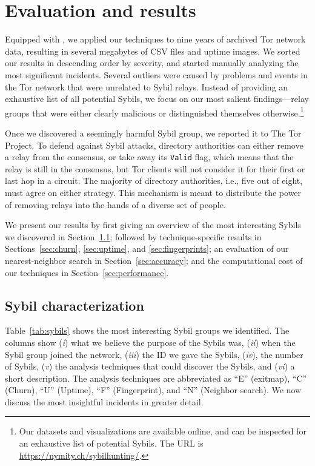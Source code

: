 \section{Evaluation and results}
\label{sec:results}
Equipped with \sys, we applied our techniques to nine years of archived Tor
network data, resulting in several megabytes of CSV files and uptime images.  We
sorted our results in descending order by severity, and started manually
analyzing the most significant incidents.  Several outliers were caused by
problems and events in the Tor network that were unrelated to Sybil relays.
Instead of providing an exhaustive list of all potential Sybils, we focus on our
most salient findings---relay groups that were either clearly malicious or
distinguished themselves otherwise.\footnote{Our datasets and visualizations are
available online, and can be inspected for an exhaustive list of potential
Sybils.  The URL is \url{https://nymity.ch/sybilhunting/}.}

Once we discovered a seemingly harmful Sybil group, we reported it to The Tor
Project.  To defend against Sybil attacks, directory authorities can either
remove a relay from the consensus, or take away its \texttt{Valid} flag, which
means that the relay is still in the consensus, but Tor clients will not
consider it for their first or last hop in a circuit.  The majority of directory
authorities, i.e., five out of eight, must agree on either strategy.  This
mechanism is meant to distribute the power of removing relays into the hands of
a diverse set of people.

We present our results by first giving an overview of the most interesting
Sybils we discovered in Section~\ref{sec:sybil_groups}; followed by
technique-specific results in Sections~\ref{sec:churn}, \ref{sec:uptime}, and
\ref{sec:fingerprints}; an evaluation of our nearest-neighbor search in
Section~\ref{sec:accuracy}; and the computational cost of our techniques in
Section~\ref{sec:performance}.

\subsection{Sybil characterization}
\label{sec:sybil_groups}
Table~\ref{tab:sybils} shows the most interesting Sybil groups we identified.
The columns show (\emph{i}) what we believe the purpose of the Sybils was,
(\emph{ii}) when the Sybil group joined the network, (\emph{iii}) the ID we gave
the Sybils, (\emph{iv}), the number of Sybils, (\emph{v}) the analysis
techniques that could discover the Sybils, and (\emph{vi}) a short description.
The analysis techniques are abbreviated as ``E'' (exitmap), ``C'' (Churn), ``U''
(Uptime), ``F'' (Fingerprint), and ``N'' (Neighbor search).  We now discuss the
most insightful incidents in greater detail.

